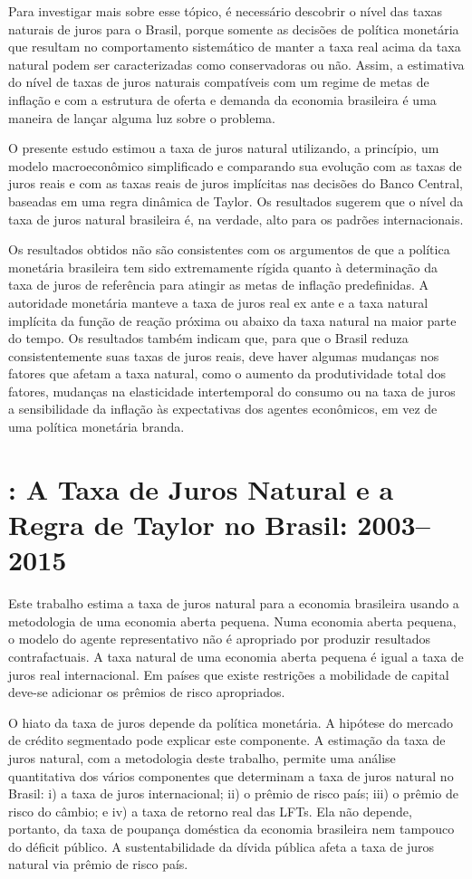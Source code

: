 Para investigar mais sobre esse tópico, é necessário descobrir o nível das taxas naturais de juros para o Brasil, porque somente as decisões de política monetária que resultam no comportamento sistemático de manter a taxa real acima da taxa natural podem ser caracterizadas como conservadoras ou não. Assim, a estimativa do nível de taxas de juros naturais compatíveis com um regime de metas de inflação e com a estrutura de oferta e demanda da economia brasileira é uma maneira de lançar alguma luz sobre o problema.

O presente estudo estimou a taxa de juros natural utilizando, a princípio, um modelo macroeconômico simplificado e comparando sua evolução com as taxas de juros reais e com as taxas reais de juros implícitas nas decisões do Banco Central, baseadas em uma regra dinâmica de Taylor. Os resultados sugerem que o nível da taxa de juros natural brasileira é, na verdade, alto para os padrões internacionais. 

Os resultados obtidos não são consistentes com os argumentos de que a política monetária brasileira tem sido extremamente rígida quanto à determinação da taxa de juros de referência para atingir as metas de inflação predefinidas. A autoridade monetária manteve a taxa de juros real ex ante e a taxa natural implícita da função de reação próxima ou abaixo da taxa natural na maior parte do tempo. Os resultados também indicam que, para que o Brasil reduza consistentemente suas taxas de juros reais, deve haver algumas mudanças nos fatores que afetam a taxa natural, como o aumento da produtividade total dos fatores, mudanças na elasticidade intertemporal do consumo ou na taxa de juros a sensibilidade da inflação às expectativas dos agentes econômicos, em vez de uma política monetária branda.
%
%
\section{\citet{Barbosa:2016}: A Taxa de Juros Natural e a Regra de Taylor no Brasil: 2003–2015 }

Este trabalho estima a taxa de juros natural para a economia brasileira usando a metodologia de uma economia aberta pequena. Numa economia aberta pequena, o modelo do agente representativo não é apropriado por produzir resultados contrafactuais. A taxa natural de uma economia aberta pequena é igual a taxa de juros real internacional. Em países que existe restrições a mobilidade de capital deve-se adicionar os prêmios de risco apropriados.

O hiato da taxa de juros depende da política monetária. A hipótese do mercado
de crédito segmentado pode explicar este componente. A estimação da taxa de juros natural, com a metodologia deste trabalho, permite uma análise quantitativa dos vários componentes que determinam a taxa de juros natural no Brasil: i) a taxa de juros internacional; ii) o prêmio de risco país; iii) o prêmio de risco do câmbio; e iv) a taxa de retorno real das LFTs.  Ela não depende, portanto, da taxa de poupança doméstica da economia brasileira nem tampouco do déficit público. A sustentabilidade da dívida pública afeta a taxa de juros natural via prêmio de risco país.

